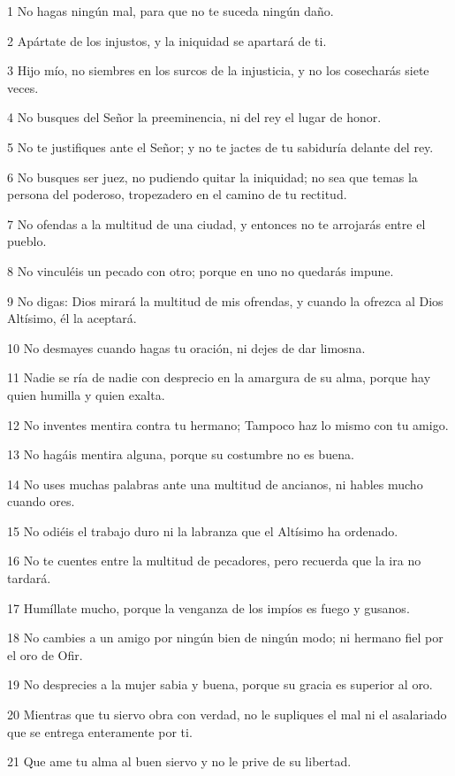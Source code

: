 \par 1 No hagas ningún mal, para que no te suceda ningún daño.
\par 2 Apártate de los injustos, y la iniquidad se apartará de ti.
\par 3 Hijo mío, no siembres en los surcos de la injusticia, y no los cosecharás siete veces.
\par 4 No busques del Señor la preeminencia, ni del rey el lugar de honor.
\par 5 No te justifiques ante el Señor; y no te jactes de tu sabiduría delante del rey.
\par 6 No busques ser juez, no pudiendo quitar la iniquidad; no sea que temas la persona del poderoso, tropezadero en el camino de tu rectitud.
\par 7 No ofendas a la multitud de una ciudad, y entonces no te arrojarás entre el pueblo.
\par 8 No vinculéis un pecado con otro; porque en uno no quedarás impune.
\par 9 No digas: Dios mirará la multitud de mis ofrendas, y cuando la ofrezca al Dios Altísimo, él la aceptará.
\par 10 No desmayes cuando hagas tu oración, ni dejes de dar limosna.
\par 11 Nadie se ría de nadie con desprecio en la amargura de su alma, porque hay quien humilla y quien exalta.
\par 12 No inventes mentira contra tu hermano; Tampoco haz lo mismo con tu amigo.
\par 13 No hagáis mentira alguna, porque su costumbre no es buena.
\par 14 No uses muchas palabras ante una multitud de ancianos, ni hables mucho cuando ores.
\par 15 No odiéis el trabajo duro ni la labranza que el Altísimo ha ordenado.
\par 16 No te cuentes entre la multitud de pecadores, pero recuerda que la ira no tardará.
\par 17 Humíllate mucho, porque la venganza de los impíos es fuego y gusanos.
\par 18 No cambies a un amigo por ningún bien de ningún modo; ni hermano fiel por el oro de Ofir.
\par 19 No desprecies a la mujer sabia y buena, porque su gracia es superior al oro.
\par 20 Mientras que tu siervo obra con verdad, no le supliques el mal ni el asalariado que se entrega enteramente por ti.
\par 21 Que ame tu alma al buen siervo y no le prive de su libertad.
